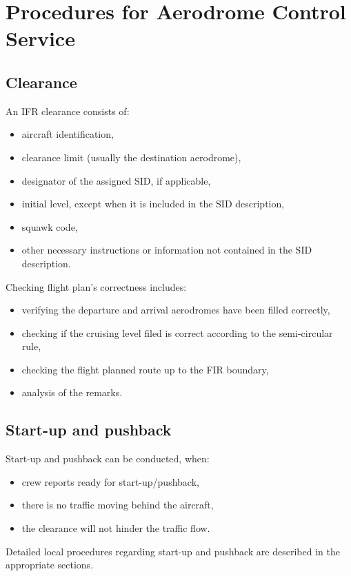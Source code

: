 \chapter{Procedures for Aerodrome Control Service}

\section{Clearance}

An IFR clearance consists of:
\begin{itemize}
    \item aircraft identification,
    \item clearance limit (usually the destination aerodrome),
    \item designator of the assigned SID, if applicable,
    \item initial level, except when it is included in the SID description,
    \item squawk code,
    \item other necessary instructions or information not contained in the SID description.
\end{itemize}

Checking flight plan's correctness includes:
\begin{itemize}
    \item verifying the departure and arrival aerodromes have been filled correctly,
    \item checking if the cruising level filed is correct according to the semi-circular rule,
    \item checking the flight planned route up to the FIR boundary,
    \item analysis of the remarks.
\end{itemize}

\section{Start-up and pushback}

Start-up and pushback can be conducted, when:
\begin{itemize}
    \item crew reports ready for start-up/pushback,
    \item there is no traffic moving behind the aircraft,
    \item the clearance will not hinder the traffic flow.
\end{itemize}

Detailed local procedures regarding start-up and pushback are described in the appropriate sections.

